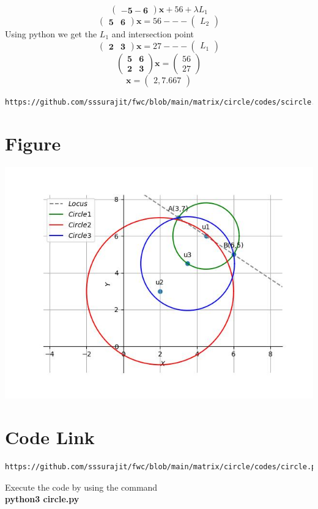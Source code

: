 \documentclass[journal,12pt,twocolumn]{IEEEtran}
\newcommand{\myvec}[1]{\ensuremath{\begin{pmatrix}#1\end{pmatrix}}}
\let\vec\mathbf
\begin{document}
\begin{equation}
    \vec{\myvec{-5-6}}{\vec x}+56+\lambda L_1
\end{equation}
\begin{equation}
    \vec{\myvec{5&6}}{\vec x}=56  ---\myvec{L_2}
\end{equation}
Using python we get the $L_1$ and intersection point
\begin{equation}
    \vec{\myvec{2&3}}{\vec x}=27 ---\myvec{L_1}
\end{equation}
\begin{equation}
    \vec{\myvec{5&6\\2&3}}{\vec x}={\myvec{56\\27}}
\end{equation}
\begin{equation}
    \vec{x}={\myvec{2,7.667}}
\end{equation}
\begin{lstlisting}
https://github.com/sssurajit/fwc/blob/main/matrix/circle/codes/scircle.py
\end{lstlisting}

\section{\textbf{Figure}}

    \centering
    \includegraphics[width=\columnwidth]{fig.jpg}
    \label{fig:my_label}
    
\section{\textbf{Code Link}}

\begin{lstlisting}
https://github.com/sssurajit/fwc/blob/main/matrix/circle/codes/circle.py
\end{lstlisting}
Execute the code by using the command
\\ \textbf{python3 circle.py}
\end{document}
